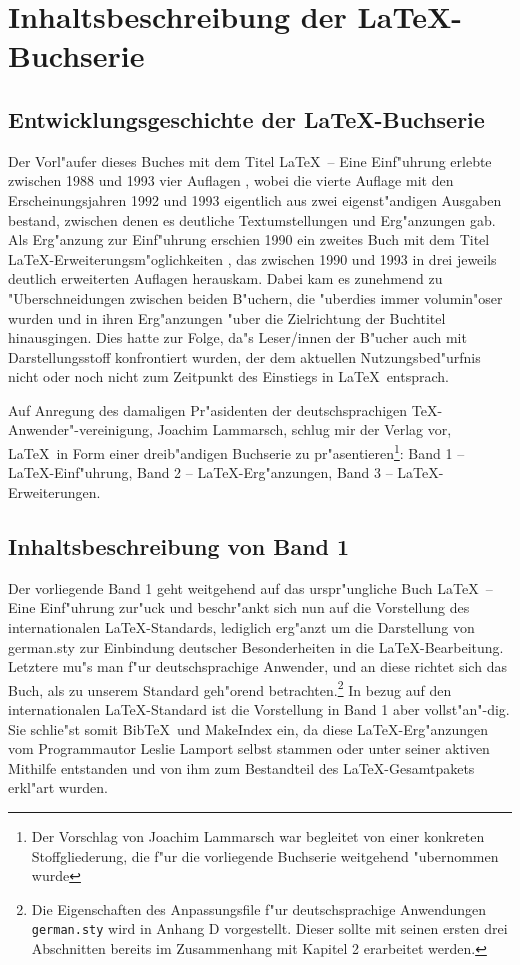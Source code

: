 \chapter{Inhaltsbeschreibung der \LaTeX-Buchserie}
\section{Entwicklungsgeschichte der \LaTeX-Buchserie}
Der Vorl"aufer dieses Buches mit dem Titel \LaTeX\ -- Eine Einf"uhrung
erlebte zwischen 1988 und 1993 vier Auflagen \cite{hku}, wobei die vierte
Auflage mit den Erscheinungsjahren 1992 und 1993 eigentlich aus zwei
eigenst"andigen Ausgaben bestand, zwischen denen es deutliche
Textumstellungen und Erg"anzungen gab. Als Erg"anzung zur Einf"uhrung
erschien 1990 ein zweites Buch mit dem Titel
\LaTeX-Erweiterungsm"oglichkeiten \cite{hkv}, das zwischen 1990 und 1993 in
drei jeweils deutlich erweiterten Auflagen herauskam. Dabei kam es zunehmend
zu "Uberschneidungen zwischen beiden B"uchern, die "uberdies immer 
volumin"oser wurden und in ihren Erg"anzungen "uber die Zielrichtung der
Buchtitel hinausgingen. Dies hatte zur Folge, da"s Leser/innen der B"ucher
auch mit Darstellungsstoff konfrontiert wurden, der dem aktuellen 
Nutzungsbed"urfnis nicht oder noch nicht zum Zeitpunkt des Einstiegs in 
\LaTeX\ entsprach.

Auf Anregung des damaligen Pr"asidenten der deutschsprachigen
\TeX-Anwender"-vereinigung, Joachim Lammarsch, schlug mir der Verlag vor,
\LaTeX\ in Form einer dreib"andigen Buchserie zu pr"asentieren\footnote{Der
Vorschlag von Joachim Lammarsch war begleitet von einer konkreten
Stoffgliederung, die f"ur die vorliegende Buchserie weitgehend "ubernommen
wurde}: 
Band 1 -- \LaTeX-Einf"uhrung, Band 2 -- \LaTeX-Erg"anzungen, Band 3 --
\LaTeX-Erweiterungen. \cite{hk}

\section{Inhaltsbeschreibung von Band 1}
Der vorliegende Band 1 \cite{hk1} geht weitgehend auf das urspr"ungliche Buch 
\LaTeX\ -- Eine Einf"uhrung \cite{hku} zur"uck und beschr"ankt sich nun
auf die Vorstellung des internationalen \LaTeX-Standards, lediglich erg"anzt
um die Darstellung von german.sty zur Einbindung deutscher 
Besonderheiten in die \LaTeX-Bearbeitung. Letztere mu"s man f"ur 
deutschsprachige Anwender, und an diese richtet sich das Buch, als zu
unserem Standard geh"orend betrachten.\footnote{Die Eigenschaften des
Anpassungsfile f"ur deutschsprachige Anwendungen \texttt{german.sty} wird
in Anhang D vorgestellt. Dieser sollte mit seinen ersten drei Abschnitten 
bereits im Zusammenhang mit Kapitel 2 erarbeitet werden.}
In bezug auf den internationalen \LaTeX-Standard ist die Vorstellung
in Band 1 aber vollst"an"-dig. Sie schlie"st somit Bib\TeX\
und MakeIndex ein, da diese \LaTeX-Erg"anzungen
vom Programmautor Leslie Lamport selbst stammen oder unter seiner
aktiven Mithilfe entstanden und von ihm zum Bestandteil des \LaTeX-Gesamtpakets 
erkl"art wurden.

